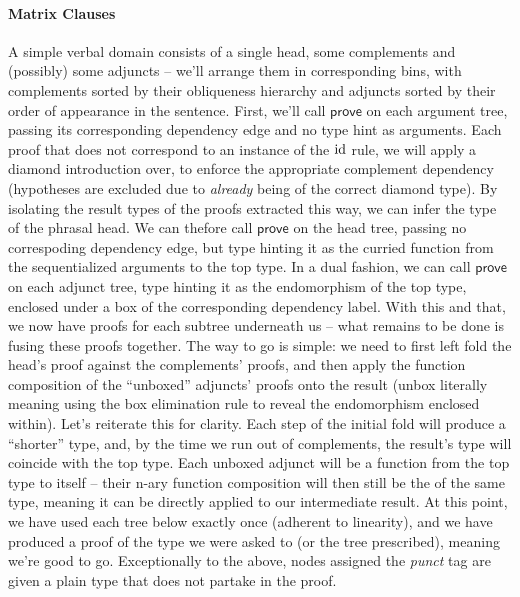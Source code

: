 \paragraph{Matrix Clauses}
A simple verbal domain consists of a single head, some complements and (possibly) some adjuncts  -- we'll arrange them in corresponding bins, with complements sorted by their obliqueness hierarchy and adjuncts sorted by their order of appearance in the sentence.
First, we'll call $\mathsf{prove}$ on each argument tree, passing its corresponding dependency edge and no type hint as arguments.
Each proof that does not correspond to an instance of the $\mathrm{id}$ rule, we will apply a diamond introduction over, to enforce the appropriate complement dependency (hypotheses are excluded due to \textit{already} being of the correct diamond type).
By isolating the result types of the proofs extracted this way, we can infer the type of the phrasal head.
We can thefore call $\mathsf{prove}$ on the head tree, passing no correspoding dependency edge, but type hinting it as the curried function from the sequentialized arguments to the top type.
In a dual fashion, we can call $\mathsf{prove}$ on each adjunct tree, type hinting it as the endomorphism of the top type, enclosed under a box of the corresponding dependency label.
With this and that, we now have proofs for each subtree underneath us -- what remains to be done is fusing these proofs together.
The way to go is simple: we need to first left fold the head's proof against the complements' proofs, and then apply the function composition of the ``unboxed'' adjuncts' proofs onto the result (unbox literally meaning using the box elimination rule to reveal the endomorphism enclosed within).
Let's reiterate this for clarity.
Each step of the initial fold will produce a ``shorter'' type, and, by the time we run out of complements, the result's type will coincide with the top type.
Each unboxed adjunct will be a function from the top type to itself -- their n-ary function composition will then still be the of the same type, meaning it can be directly applied to our intermediate result.
At this point, we have used each tree below exactly once (adherent to linearity), and we have produced a proof of the type we were asked to (or the tree prescribed), meaning we're good to go.
Exceptionally to the above, nodes assigned the \textit{punct} tag are given a plain  type that does not partake in the proof.

